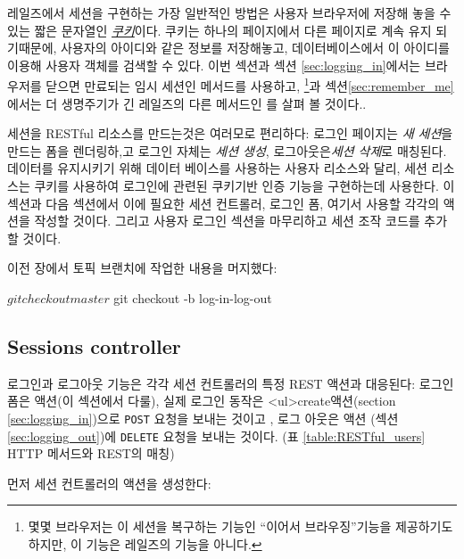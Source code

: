 레일즈에서 세션을 구현하는 가장 일반적인 방법은 사용자 브라우저에 저장해 놓을 수 있는 짧은 문자열인 \href{http://en.wikipedia.org/wiki/HTTP_cookie}{\emph{쿠키}}이다. 쿠키는 하나의 페이지에서 다른 페이지로 계속 유지 되기때문에, 사용자의 아이디와 같은 정보를 저장해놓고, 데이터베이스에서 이 아이디를 이용해 사용자 객체를 검색할 수 있다. 이번 섹션과 섹션 \ref{sec:logging_in}에서는 브라우저를 닫으면 만료되는 임시 세션인  메서드를 사용하고, \footnote{몇몇 브라우저는 이 세션을 복구하는 기능인 ``이어서 브라우징''기능을 제공하기도 하지만, 이 기능은 레일즈의 기능을 아니다.}과  섹션\ref{sec:remember_me}에서는 더 생명주기가 긴 레일즈의 다른 메서드인 를 살펴 볼 것이다.. 

세션을 RESTful 리소스를 만드는것은 여러모로 편리하다: 로그인 페이지는 \emph{새 세션}을 만드는 폼을 렌더링하,고 로그인 자체는 \emph{세션 생성}, 로그아웃은\emph{세션 삭제}로 매칭된다. 데이터를 유지시키기 위해 데이터 베이스를 사용하는 사용자 리소스와 달리, 세션 리소스는 쿠키를 사용하여 로그인에 관련된 쿠키기반 인증 기능을 구현하는데 사용한다. 이 섹션과 다음 섹션에서 이에 필요한 세션 컨트롤러, 로그인 폼, 여기서 사용할 각각의 액션을 작성할 것이다. 그리고 사용자 로그인 섹션을 마무리하고 세션 조작 코드를 추가할 것이다. 

이전 장에서 토픽 브랜치에 작업한 내용을 머지했다:

\begin{code}
$ git checkout master
$ git checkout -b log-in-log-out
\end{code}

    \subsection{Sessions controller} %
    \label{sec:sessions_controller}

로그인과 로그아웃 기능은 각각 세션 컨트롤러의 특정 REST 액션과 대응된다: 로그인 폼은  액션(이 섹션에서 다룰), 실제 로그인 동작은 <ul>{create}액션(section \ref{sec:logging_in})으로 \texttt{POST} 요청을 보내는 것이고 , 로그 아웃은  액션 (섹션 \ref{sec:logging_out})에 \texttt{DELETE} 요청을 보내는 것이다. (표 \ref{table:RESTful_users} HTTP 메서드와 REST의 매칭) 

먼저 세션 컨트롤러의  액션을 생성한다: 


